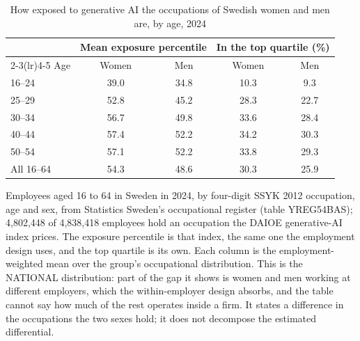 \begin{table}[ht!]
\centering
\caption{How exposed to generative AI the occupations of Swedish women and men are, by age, 2024}
\label{tab:occ_mix_by_sex}
\footnotesize
\begin{tabular}{lcccc}
\toprule
 & \multicolumn{2}{c}{Mean exposure percentile} & \multicolumn{2}{c}{In the top quartile (\%)} \\
\cmidrule(lr){2-3}\cmidrule(lr){4-5}
Age & Women & Men & Women & Men \\
\midrule
16--24 & 39.0 & 34.8 & 10.3 & 9.3 \\
25--29 & 52.8 & 45.2 & 28.3 & 22.7 \\
30--34 & 56.7 & 49.8 & 33.6 & 28.4 \\
40--44 & 57.4 & 52.2 & 34.2 & 30.3 \\
50--54 & 57.1 & 52.2 & 33.8 & 29.3 \\
\midrule
All 16--64 & 54.3 & 48.6 & 30.3 & 25.9 \\
\bottomrule
\end{tabular}
\begin{minipage}{0.92\textwidth}\footnotesize\vspace{4pt}
Employees aged 16 to 64 in Sweden in 2024, by four-digit SSYK 2012 occupation, age and sex, from Statistics Sweden's occupational register (table YREG54BAS); 4,802,448 of 4,838,418 employees hold an occupation the DAIOE generative-AI index prices. The exposure percentile is that index, the same one the employment design uses, and the top quartile is its own. Each column is the employment-weighted mean over the group's occupational distribution. This is the NATIONAL distribution: part of the gap it shows is women and men working at different employers, which the within-employer design absorbs, and the table cannot say how much of the rest operates inside a firm. It states a difference in the occupations the two sexes hold; it does not decompose the estimated differential.
\end{minipage}
\end{table}
